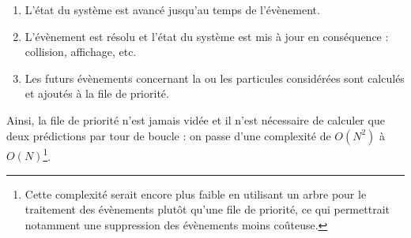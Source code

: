 \documentclass{tufte-handout}
\begin{document}
\begin{itemize}
\begin{itemize}
\begin{enumerate}
        \item L'état du système est avancé jusqu'au temps de l'évènement.

        \item L'évènement est résolu et l'état du système est mis à jour en conséquence : collision, affichage, etc.

        \item Les futurs évènements concernant la ou les particules considérées sont calculés et ajoutés à la file de priorité.
      \end{enumerate}

      Ainsi, la file de priorité n'est jamais vidée et il n'est nécessaire de calculer que deux prédictions par tour de boucle : on passe d'une complexité de $O(N^2)$ à $O(N)$\footnote{Cette complexité serait encore plus faible en utilisant un arbre pour le traitement des évènements plutôt qu'une file de priorité, ce qui permettrait notamment une suppression des évènements moins coûteuse.}.
    \end{itemize}
  \end{itemize}
\end{document}
